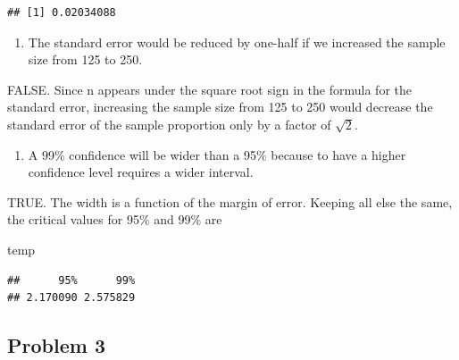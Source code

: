 \documentclass[
]{book}
\newenvironment{Shaded}{\begin{snugshade}}{\end{snugshade}}
\newcommand{\DecValTok}[1]{\textcolor[rgb]{0.00,0.00,0.81}{#1}}
\newcommand{\KeywordTok}[1]{\textcolor[rgb]{0.13,0.29,0.53}{\textbf{#1}}}
\newcommand{\NormalTok}[1]{#1}
\newcommand{\StringTok}[1]{\textcolor[rgb]{0.31,0.60,0.02}{#1}}
\providecommand{\tightlist}{%
  \setlength{\itemsep}{0pt}\setlength{\parskip}{0pt}}
\begin{document}
\begin{verbatim}
## [1] 0.02034088
\end{verbatim}

\begin{enumerate}
\def\labelenumi{\alph{enumi}.}
\setcounter{enumi}{4}
\tightlist
\item
  The standard error would be reduced by one-half if we increased the sample size from 125 to 250.
\end{enumerate}

FALSE. Since n appears under the square root sign in the formula for the standard error, increasing the sample size from 125 to 250 would decrease the standard error of the sample proportion only by a factor of \(\sqrt{2}\).

\begin{enumerate}
\def\labelenumi{\alph{enumi}.}
\setcounter{enumi}{5}
\tightlist
\item
  A 99\% confidence will be wider than a 95\% because to have a higher confidence level requires a wider interval.
\end{enumerate}

TRUE. The width is a function of the margin of error. Keeping all else the same, the critical values for 95\% and 99\% are

\begin{Shaded}
\end{Shaded}

\begin{Shaded}
\begin{Highlighting}[]
\NormalTok{temp}
\end{Highlighting}
\end{Shaded}

\begin{verbatim}
##      95%      99% 
## 2.170090 2.575829
\end{verbatim}

\hypertarget{problem-3-15}{%
\subsection{Problem 3}\label{problem-3-15}}
\end{document}
